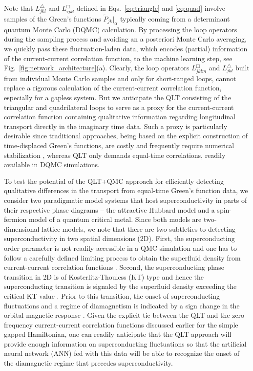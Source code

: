 \documentclass[amsmath,amssymb, aps, prx, longbibliography, twocolumn]{revtex4-1}
\begin{document}
Note that  $L^\triangle_{jkl}$ and  $L^\Box_{ijkl}$ defined in Eqs.~\eqref{eq:triangle} and \eqref{eq:quad} involve samples of the Green's functions $\widetilde{P}_{jk}|_{\alpha}$ typically coming from a determinant quantum Monte Carlo (DQMC) calculation. 
By processing the loop operators during the sampling process and avoiding an a posteriori Monte Carlo averaging, we quickly pass these fluctuation-laden data, which encodes (partial) information of the current-current correlation function, to the machine learning step, see Fig.~\ref{fig:network_architecture}(a). 
Clearly, the loop operators $L^\Box_{jklm}$ and $ L^\triangle_{jkl}$ built from individual Monte Carlo samples and only for short-ranged loops, cannot replace a rigorous calculation of the current-current correlation function, especially for a gapless system. But we anticipate the QLT consisting of the triangular and quadrilateral loops to serve as a proxy for the current-current correlation function containing qualitative information regarding longitudinal transport directly in the imaginary time data. Such a proxy is particularly desirable since traditional approaches, being based on the explicit construction of time-displaced Green's functions, are costly and frequently require numerical stabilization \cite{Hirsch1988, Santos2003}, whereas QLT only demands equal-time correlations, readily available in DQMC simulations.




%
To test the potential of the QLT+QMC approach for efficiently detecting qualitative differences in the transport from equal-time Green's function data, we consider two paradigmatic model systems that host superconductivity in parts of their respective phase diagrams -- the attractive Hubbard model and a spin-fermion model of a quantum critical metal.
Since both models are two-dimensional lattice models, we note that there are two subtleties to detecting superconductivity  in two spatial dimensions (2D). First, the superconducting order parameter is not readily accessible in a QMC simulation and one has to follow a carefully defined limiting process to obtain the superfluid density from current-current correlation functions \cite{Scalapino1993, Scalapino1992}. Second, the superconducting phase transition in 2D is of Kosterlitz-Thouless (KT) type and hence the superconducting transition is signaled by the superfluid density exceeding the  critical KT value \cite{KT1973}. Prior to this transition, the onset of superconducting fluctuations and a regime of diamagnetism is indicated by a sign change in the orbital magnetic response \cite{Schattner2016}. Given the explicit tie between the QLT and the zero-frequency current-current correlation functions discussed earlier for the simple gapped Hamiltonian, one can readily anticipate that the QLT approach will provide enough information on superconducting fluctuations so that the artificial neural network (ANN) fed with this data will be able to recognize the onset of the diamagnetic regime that precedes  superconductivity.  
\end{document}
